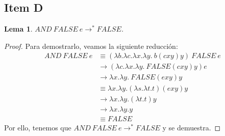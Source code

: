 \documentclass{article}
\newtheorem*{lemma*}{Lema}
\begin{document}
\subsection*{Item D}
\begin{lemma*}
  $AND\ FALSE\ e \to^* FALSE$.
\end{lemma*}
\begin{proof}
  Para demostrarlo, veamos la siguiente reducción:
  \begin{equation*}
    \begin{aligned}
      AND\ FALSE\ e &\equiv (\lambda b.\lambda c.\lambda x.\lambda y.\ b(cxy)y)\ FALSE\ e \\ 
                    &\to (\lambda c.\lambda x.\lambda y.\ FALSE(cxy)y)e \\ 
                    &\to \lambda x.\lambda y.\ FALSE(exy)y \\ 
                    &\equiv \lambda x.\lambda y. (\lambda s.\lambda t. t)(exy)y \\ 
                    &\to \lambda x.\lambda y. (\lambda t. t)y \\ 
                    &\to \lambda x.\lambda y. y \\ 
                    &\equiv FALSE
    \end{aligned}
  \end{equation*}
  Por ello, tenemos que $AND\ FALSE\ e \to^* FALSE$ y se demuestra.
\end{proof}
\end{document}
